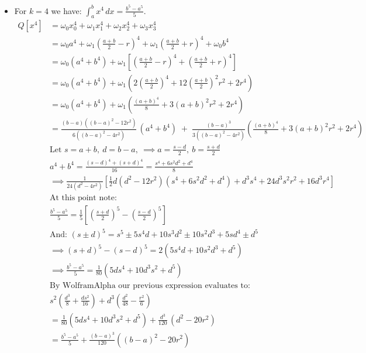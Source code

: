 \documentclass[]{article}
\begin{document}
\begin{enumerate}
\begin{itemize}
\item For $k=4$ we have: \(\displaystyle \int_a^b x^4\,dx=\frac{b^5-a^5}{5}\).
\begin{align*}
Q[x^4]
&=\omega_0 x_0^4+\omega_1 x_1^4+\omega_2 x_2^4+\omega_3 x_3^4\\
&=\omega_0 a^4+\omega_1\left(\frac{a+b}{2}-r\right)^{\!4}
+\omega_1\left(\frac{a+b}{2}+r\right)^{\!4}
+\omega_0 b^4\\
&=\omega_0(a^4+b^4)+\omega_1\!\left[\left(\frac{a+b}{2}-r\right)^{\!4}+\left(\frac{a+b}{2}+r\right)^{\!4}\right]\\
&=\omega_0(a^4+b^4)+\omega_1\!\left(2\left(\frac{a+b}{2}\right)^{\!4}+12\left(\frac{a+b}{2}\right)^{\!2}r^{2}+2r^{4}\right)\\
&=\omega_0(a^4+b^4)+\omega_1\!\left(\frac{(a+b)^4}{8}+3(a+b)^2r^{2}+2r^{4}\right)\\[2pt]
&=\frac{(b-a)\left((b-a)^2-12r^2\right)}{6\left((b-a)^2-4r^2\right)}\,(a^4+b^4)
\;+\;\frac{(b-a)^3}{3\left((b-a)^2-4r^2\right)}
\left(\frac{(a+b)^4}{8}+3(a+b)^2r^{2}+2r^{4}\right)\\
& \text{Let } s=a+b,\ d=b-a,\ \implies a=\frac{s-d}{2},\ b=\frac{s+d}{2}\\
&a^4+b^4=\frac{(s-d)^{4}+(s+d)^{4}}{16}
=\frac{s^{4}+6s^{2}d^{2}+d^{4}}{8}\\
&\implies \frac{1}{24(d^{2}-4r^{2})}\left[\frac{1}{2}d(d^{2}-12r^{2})(s^{4}+6s^{2}d^{2}+d^{4}) +d^{3}s^{4}+24d^{3}s^{2}r^{2}+16d^{3}r^{4}\right]\\
&\text{At this point note:}\\
&\displaystyle \frac{b^{5}-a^{5}}{5}=\frac{1}{5}\left[\left(\frac{s+d}{2}\right)^{5}-\left(\frac{s-d}{2}\right)^{5}\right]\\
&\text{And: }\displaystyle (s\pm d)^{5} = s^{5} \pm 5s^{4}d+10s^{3}d^{2}\pm 10s^{2}d^{3}+5sd^{4}\pm d^{5}\\
&\implies \displaystyle (s+d)^{5}-(s-d)^{5}
=2\left(5s^{4}d+10s^{2}d^{3}+d^{5}\right)\\
&\implies \frac{b^{5}-a^{5}}{5} = \frac{1}{80}\left(5ds^4+10d^3s^2+d^5\right)\\
&\text{By WolframAlpha our previous expression evaluates to:}\\
&s^2\left(\frac{d^3}{8}+\frac{ds^2}{16}\right) + d^3\left(\frac{d^2}{48}-\frac{r^2}{6}\right)\\
&=\frac{1}{80}\left(5ds^{4}+10d^{3}s^{2}+d^{5}\right)
+\frac{d^{3}}{120}\,(d^{2}-20r^{2})\\
&=\frac{b^{5}-a^{5}}{5}+\frac{(b-a)^{3}}{120}\left((b-a)^{2}-20r^{2}\right)\\

\end{align*}
\end{itemize}
\end{enumerate}
\end{document}
